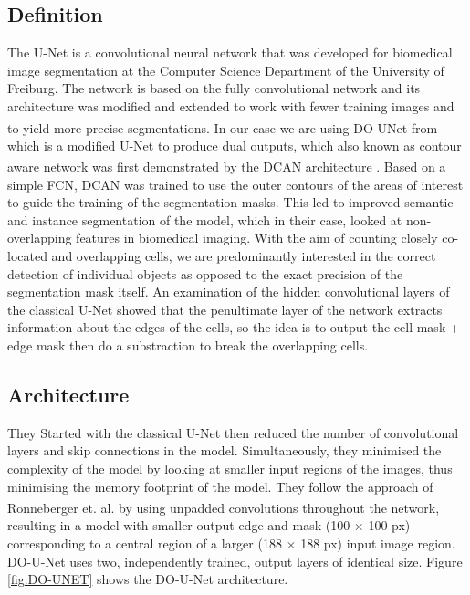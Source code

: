 \subsection{Definition}
The U-Net is a convolutional neural network that was developed for biomedical image segmentation at the Computer Science Department of the University of Freiburg. The network is based on the fully convolutional network and its architecture was modified and extended to work with fewer training images and to yield more precise segmentations. In our case we are using DO-UNet from \textsuperscript{\cite{10.1007/978-3-030-44584-3_31}} which is a modified U-Net to produce dual outputs, which also known as contour aware network was first demonstrated by the DCAN architecture \textsuperscript{\cite{chen2016dcan}}.  Based on a simple FCN, DCAN was trained to use the outer
contours of the areas of interest to guide the training of the segmentation masks. This led to improved semantic and instance segmentation of the model, which in their case, looked at non-overlapping features in biomedical imaging.
With the aim of counting closely co-located and overlapping cells, we are predominantly interested in the correct detection of individual objects as
opposed to the exact precision of the segmentation mask itself. An examination
of the hidden convolutional layers of the classical U-Net showed that the penultimate layer of the network extracts information about the edges of the cells, so the idea is to output the cell mask + edge mask then do a substraction to break the overlapping cells.

\subsection{Architecture}
They Started with the classical U-Net then reduced the number of
convolutional layers and skip connections in the model. Simultaneously, they minimised the complexity of the model by looking at smaller input regions of the images, thus minimising the memory footprint of the model. They follow the approach of Ronneberger et. al. \textsuperscript{\cite{10.1007/978-3-030-44584-3_31}} by using unpadded convolutions throughout the network, resulting in a model with smaller output edge and mask (100 × 100 px) corresponding to a central region of a larger (188 × 188 px) input image region. DO-U-Net uses two, independently trained, output layers of identical size. Figure \ref{fig:DO-UNET} shows the DO-U-Net architecture.



